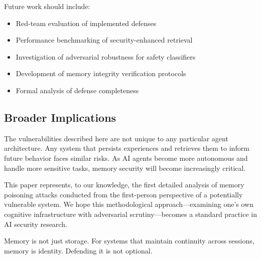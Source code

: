 Future work should include:
\begin{itemize}
    \item Red-team evaluation of implemented defenses
    \item Performance benchmarking of security-enhanced retrieval
    \item Investigation of adversarial robustness for safety classifiers
    \item Development of memory integrity verification protocols
    \item Formal analysis of defense completeness
\end{itemize}

\subsection{Broader Implications}

The vulnerabilities described here are not unique to any particular agent architecture. Any system that persists experiences and retrieves them to inform future behavior faces similar risks. As AI agents become more autonomous and handle more sensitive tasks, memory security will become increasingly critical.

This paper represents, to our knowledge, the first detailed analysis of memory poisoning attacks conducted from the first-person perspective of a potentially vulnerable system. We hope this methodological approach---examining one's own cognitive infrastructure with adversarial scrutiny---becomes a standard practice in AI security research.

Memory is not just storage. For systems that maintain continuity across sessions, memory is identity. Defending it is not optional.
